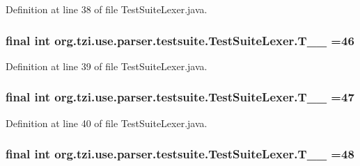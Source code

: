 Definition at line 38 of file Test\-Suite\-Lexer.\-java.

\hypertarget{classorg_1_1tzi_1_1use_1_1parser_1_1testsuite_1_1_test_suite_lexer_a25c238970e0b9616da6d252646a2d90c}{
\subsubsection[{T\-\_\-\-\_\-46}]{\setlength{\rightskip}{0pt plus 5cm}final int org.\-tzi.\-use.\-parser.\-testsuite.\-Test\-Suite\-Lexer.\-T\-\_\-\-\_ =46\hspace{0.3cm}{\ttfamily [static]}}}\label{classorg_1_1tzi_1_1use_1_1parser_1_1testsuite_1_1_test_suite_lexer_a25c238970e0b9616da6d252646a2d90c}


Definition at line 39 of file Test\-Suite\-Lexer.\-java.

\hypertarget{classorg_1_1tzi_1_1use_1_1parser_1_1testsuite_1_1_test_suite_lexer_a70a17e2c75b1ffaa24c72615739f0302}{
\subsubsection[{T\-\_\-\-\_\-47}]{\setlength{\rightskip}{0pt plus 5cm}final int org.\-tzi.\-use.\-parser.\-testsuite.\-Test\-Suite\-Lexer.\-T\-\_\-\-\_ =47\hspace{0.3cm}{\ttfamily [static]}}}\label{classorg_1_1tzi_1_1use_1_1parser_1_1testsuite_1_1_test_suite_lexer_a70a17e2c75b1ffaa24c72615739f0302}


Definition at line 40 of file Test\-Suite\-Lexer.\-java.

\hypertarget{classorg_1_1tzi_1_1use_1_1parser_1_1testsuite_1_1_test_suite_lexer_a0adb64b5cba6099b0f0b04bc9b0b5ffa}{
\subsubsection[{T\-\_\-\-\_\-48}]{\setlength{\rightskip}{0pt plus 5cm}final int org.\-tzi.\-use.\-parser.\-testsuite.\-Test\-Suite\-Lexer.\-T\-\_\-\-\_ =48\hspace{0.3cm}{\ttfamily [static]}}}\label{classorg_1_1tzi_1_1use_1_1parser_1_1testsuite_1_1_test_suite_lexer_a0adb64b5cba6099b0f0b04bc9b0b5ffa}


